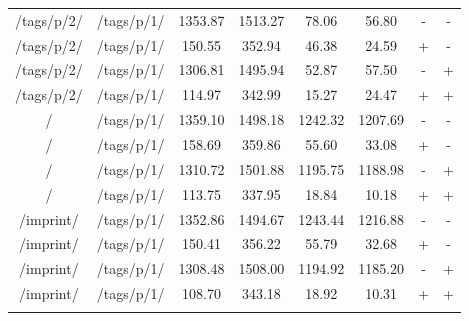 \begin{appendix}
\begin{center}
\begin{longtable}{cccccccc}
\hline
/tags/p/2/ & /tags/p/1/ & 1353.87 & 1513.27 & 78.06 & 56.80 & - & - \\
/tags/p/2/ & /tags/p/1/ & 150.55 & 352.94 & 46.38 & 24.59 & + & - \\
/tags/p/2/ & /tags/p/1/ & 1306.81 & 1495.94 & 52.87 & 57.50 & - & + \\
/tags/p/2/ & /tags/p/1/ & 114.97 & 342.99 & 15.27 & 24.47 & + & + \\
\hline
\hline
/ & /tags/p/1/ & 1359.10 & 1498.18 & 1242.32 & 1207.69 & - & - \\
/ & /tags/p/1/ & 158.69 & 359.86 & 55.60 & 33.08 & + & - \\
/ & /tags/p/1/ & 1310.72 & 1501.88 & 1195.75 & 1188.98 & - & + \\
/ & /tags/p/1/ & 113.75 & 337.95 & 18.84 & 10.18 & + & + \\
\hline
/imprint/ & /tags/p/1/ & 1352.86 & 1494.67 & 1243.44 & 1216.88 & - & - \\
/imprint/ & /tags/p/1/ & 150.41 & 356.22 & 55.79 & 32.68 & + & - \\
/imprint/ & /tags/p/1/ & 1308.48 & 1508.00 & 1194.92 & 1185.20 & - & + \\
/imprint/ & /tags/p/1/ & 108.70 & 343.18 & 18.92 & 10.31 & + & + \\
\hline
\label{tab:selenium_results_local}
\end{longtable}
\end{center}

\newpage{}


\end{appendix}
